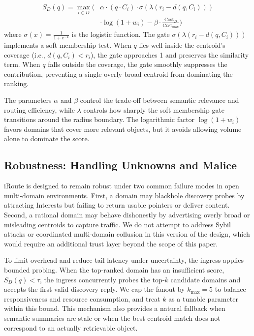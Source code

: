\documentclass[conference]{IEEEtran}
\newcommand{\sysname}{iRoute}
\begin{document}
\begin{equation}
\label{eq:score}
\begin{split}
    S_D(q) = \max_{i \in D} \bigg( & \alpha \cdot (q \cdot C_i) \cdot \sigma(\lambda(r_i - d(q, C_i))) \\
    & \cdot \log(1+w_i) - \beta \cdot \frac{\text{Cost}_D}{\text{Cost}_{\max}} \bigg)
\end{split}
\end{equation}
where $\sigma(x)=\frac{1}{1+e^{-x}}$ is the logistic function.
The gate $\sigma(\lambda(r_i - d(q, C_i)))$ implements a soft membership test.
When $q$ lies well inside the centroid's coverage (i.e., $d(q,C_i) < r_i$), the gate approaches 1 and preserves the similarity term.
When $q$ falls outside the coverage, the gate smoothly suppresses the contribution, preventing a single overly broad centroid from dominating the ranking.

The parameters $\alpha$ and $\beta$ control the trade-off between semantic relevance and routing efficiency, while $\lambda$ controls how sharply the soft membership gate transitions around the radius boundary.
The logarithmic factor $\log(1+w_i)$ favors domains that cover more relevant objects, but it avoids allowing volume alone to dominate the score.

\subsection{Robustness: Handling Unknowns and Malice}
\label{sec:spec_robustness}

\sysname{} is designed to remain robust under two common failure modes in open multi-domain environments.
First, a domain may blackhole discovery probes by attracting Interests but failing to return usable pointers or deliver content.
Second, a rational domain may behave dishonestly by advertising overly broad or misleading centroids to capture traffic.
We do not attempt to address Sybil attacks or coordinated multi-domain collusion in this version of the design, which would require an additional trust layer beyond the scope of this paper.

To limit overhead and reduce tail latency under uncertainty, the ingress applies bounded probing.
When the top-ranked domain has an insufficient score, $S_D(q) < \tau$, the ingress concurrently probes the top-$k$ candidate domains and accepts the first valid discovery reply.
We cap the fanout by $k_{\max}=5$ to balance responsiveness and resource consumption, and treat $k$ as a tunable parameter within this bound.
This mechanism also provides a natural fallback when semantic summaries are stale or when the best centroid match does not correspond to an actually retrievable object.
\end{document}
